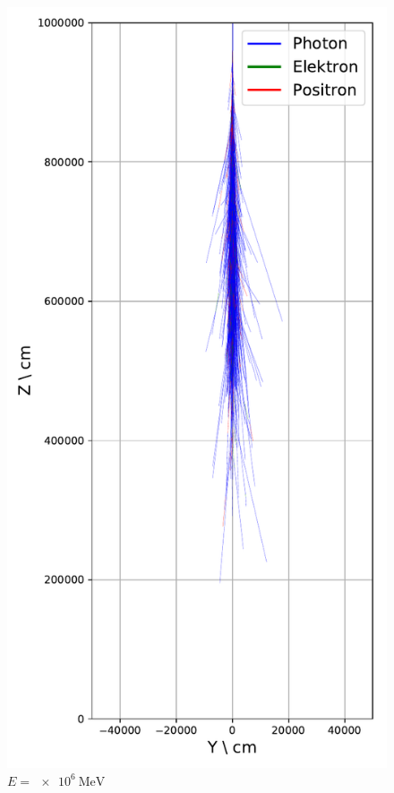 \documentclass[aspectratio=1610, captions=tableheading, 11pt]{beamer}
\begin{document}
\begin{frame}
\begin{columns}
    \begin{column}{0.33\textwidth}
      \begin{figure}
          \centering
          \includegraphics[height=0.9\textheight]{shower_presentation/2d_shower_1e6.png}
          \caption*{$E = \SI{e6}{\mega\electronvolt}$}
      \end{figure}
    \end{column}


\end{columns}
\end{frame}
\end{document}
